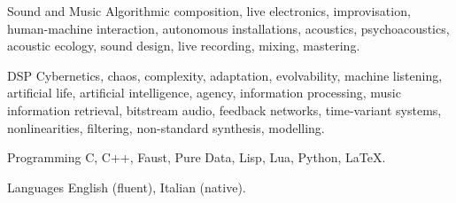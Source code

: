 

\begin{cvskills}

  \cvskill
    {Sound and Music} %
    {Algorithmic composition, live electronics, improvisation, human-machine interaction, autonomous installations, acoustics, psychoacoustics, acoustic ecology, sound design, live recording, mixing, mastering.} %

  \cvskill
    {DSP} %
    {Cybernetics, chaos, complexity, adaptation, evolvability, machine listening, artificial life, artificial intelligence, agency, information processing, music information retrieval, bitstream audio, feedback networks, time-variant systems, nonlinearities, filtering, non-standard synthesis, modelling.} %

  \cvskill
    {Programming} %
    {C, C++, Faust, Pure Data, Lisp, Lua, Python, LaTeX.} %

  \cvskill
    {Languages} %
    {English (fluent), Italian (native).} %

\end{cvskills}
